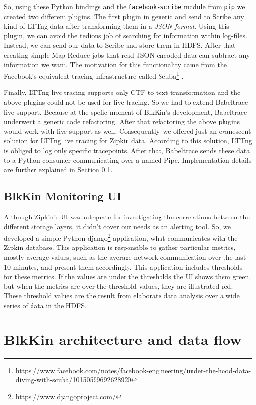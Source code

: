 So, using these Python bindings and the \texttt{facebook-scribe} module from
\texttt{pip} we created two different plugins. The first plugin in generic and
send to Scribe any kind of LTTng data after transforming them in a \textit{JSON
format}.  Using this plugin, we can avoid the tedious job of searching for
information within log-files. Instead, we can send our data to Scribe and store
them in HDFS. After that creating simple Map-Reduce jobs that read JSON encoded
data can subtract any information we want. The motivation for this functionality
came from the Facebook's equivalent tracing infrastructure called
Scuba\footnote{https://www.facebook.com/notes/facebook-engineering/under-the-hood-data-diving-with-scuba/10150599692628920}
\cite{scuba}. 

Finally, LTTng live tracing supports only CTF to text transformation and the
above plugins could not be used for live tracing. So we had to extend Babeltrace
live support. Because at the spefic moment of BlkKin's development, Babeltrace
underwent a generic code refactoring. After that refactoring the above plugins
would work with live support as well. Consequently, we offered just an
evanescent solution for LTTng live tracing for Zipkin data. According to this
solution, LTTng is obliged to log only specific tracepoints. After that,
Babeltrace sends these data to a Python consumer communicating over a named
Pipe. Implementation details are further explained in Section \ref{}.

\subsection{BlkKin Monitoring UI}
Although Zipkin's UI was adequate for investigating the correlations between the
different storage layers, it didn't cover our needs as an alerting tool. So, we
developed a simple Python-django\footnote{https://www.djangoproject.com/}
application, what communicates with the Zipkin database. This application is
responsible to gather particular metrics, mostly average values, such as the
average network communication over the last 10 minutes, and present them
accordingly. This application includes thresholds for these metrics. If the
values are under the thresholds the UI shows them green, but when the metrics
are over the threshold values, they are illustrated red. These threshold values
are the result from elaborate data analysis over a wide series of data in the
HDFS.

\section{BlkKin architecture and data flow}\label{sec:flow}

